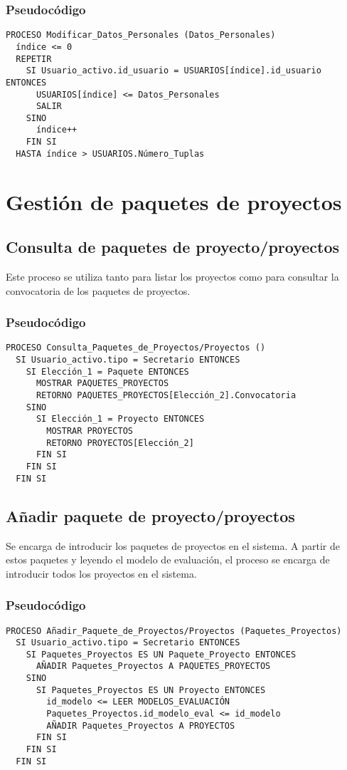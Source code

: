 \documentclass[12pt,a4paper,spanish,twoside]{book}
\begin{document}
\subsubsection{Pseudocódigo}
\begin{lstlisting}[inputencoding=utf8/latin1]
PROCESO Modificar_Datos_Personales (Datos_Personales)
  índice <= 0
  REPETIR
    SI Usuario_activo.id_usuario = USUARIOS[índice].id_usuario ENTONCES
      USUARIOS[índice] <= Datos_Personales
      SALIR
    SINO
      índice++
    FIN SI
  HASTA índice > USUARIOS.Número_Tuplas
\end{lstlisting}

\section{Gestión de paquetes de proyectos}

\subsection{Consulta de paquetes de proyecto/proyectos}
Este proceso se utiliza tanto para listar los proyectos como para consultar la 
convocatoria de los paquetes de proyectos.

\subsubsection{Pseudocódigo}
\begin{lstlisting}[inputencoding=utf8/latin1] 
PROCESO Consulta_Paquetes_de_Proyectos/Proyectos ()
  SI Usuario_activo.tipo = Secretario ENTONCES
    SI Elección_1 = Paquete ENTONCES
      MOSTRAR PAQUETES_PROYECTOS
      RETORNO PAQUETES_PROYECTOS[Elección_2].Convocatoria
    SINO
      SI Elección_1 = Proyecto ENTONCES
        MOSTRAR PROYECTOS
        RETORNO PROYECTOS[Elección_2]
      FIN SI
    FIN SI
  FIN SI
\end{lstlisting}

\subsection{Añadir paquete de proyecto/proyectos}
Se encarga de introducir los paquetes de proyectos en el sistema. A partir de 
estos paquetes y leyendo el modelo de evaluación, el proceso se encarga de 
introducir todos los proyectos en el sistema.

\subsubsection{Pseudocódigo}
\begin{lstlisting}[inputencoding=utf8/latin1]
PROCESO Añadir_Paquete_de_Proyectos/Proyectos (Paquetes_Proyectos)
  SI Usuario_activo.tipo = Secretario ENTONCES
    SI Paquetes_Proyectos ES UN Paquete_Proyecto ENTONCES
      AÑADIR Paquetes_Proyectos A PAQUETES_PROYECTOS
    SINO
      SI Paquetes_Proyectos ES UN Proyecto ENTONCES
        id_modelo <= LEER MODELOS_EVALUACIÓN
        Paquetes_Proyectos.id_modelo_eval <= id_modelo
        AÑADIR Paquetes_Proyectos A PROYECTOS
      FIN SI
    FIN SI
  FIN SI
\end{lstlisting}
\end{document}

